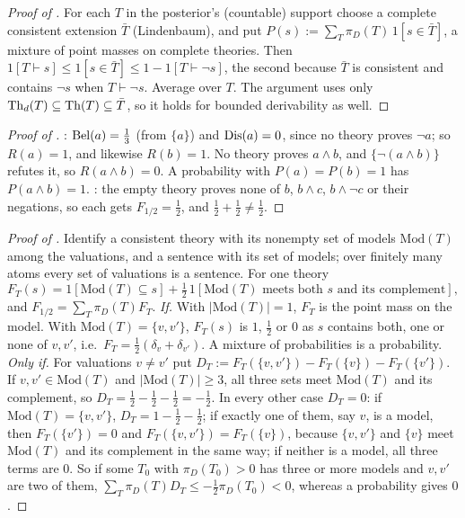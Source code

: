 \begin{proof}[Proof of ]
For each $T$ in the posterior's (countable) support choose a complete consistent extension $\bar T$ (Lindenbaum), and put $P(s):=\sum_T\pi_D(T)\,1[s\in\bar T]$, a mixture of point masses on complete theories. Then $1[T\vdash s]\le1[s\in\bar T]\le1-1[T\vdash\neg s]$, the second because $\bar T$ is consistent and contains $\neg s$ when $T\vdash\neg s$. Average over $T$. The argument uses only $\mathrm{Th}_d(T)\subseteq\mathrm{Th}(T)\subseteq\bar T$, so it holds for bounded derivability as well.
\end{proof}

\begin{proof}[Proof of ]
: $\mathrm{Bel}(a)=\tfrac13$ (from $\{a\}$) and $\mathrm{Dis}(a)=0$, since no theory proves $\neg a$; so $R(a)=1$, and likewise $R(b)=1$. No theory proves $a\wedge b$, and $\{\neg(a\wedge b)\}$ refutes it, so $R(a\wedge b)=0$. A probability with $P(a)=P(b)=1$ has $P(a\wedge b)=1$.
: the empty theory proves none of $b$, $b\wedge c$, $b\wedge\neg c$ or their negations, so each gets $F_{1/2}=\tfrac12$, and $\tfrac12+\tfrac12\ne\tfrac12$.
\end{proof}

\begin{proof}[Proof of ]
Identify a consistent theory with its nonempty set of models $\mathrm{Mod}(T)$ among the valuations, and a sentence with its set of models; over finitely many atoms every set of valuations is a sentence. For one theory
\[
F_T(s)=1[\mathrm{Mod}(T)\subseteq s]+\tfrac12\,1[\mathrm{Mod}(T)\text{ meets both }s\text{ and its complement}],
\]
and $F_{1/2}=\sum_T\pi_D(T)F_T$.
\emph{If.} With $|\mathrm{Mod}(T)|=1$, $F_T$ is the point mass on the model. With $\mathrm{Mod}(T)=\{v,v'\}$, $F_T(s)$ is $1$, $\tfrac12$ or $0$ as $s$ contains both, one or none of $v,v'$, i.e.\ $F_T=\tfrac12(\delta_v+\delta_{v'})$. A mixture of probabilities is a probability.
\emph{Only if.} For valuations $v\ne v'$ put $D_T:=F_T(\{v,v'\})-F_T(\{v\})-F_T(\{v'\})$. If $v,v'\in\mathrm{Mod}(T)$ and $|\mathrm{Mod}(T)|\ge3$, all three sets meet $\mathrm{Mod}(T)$ and its complement, so $D_T=\tfrac12-\tfrac12-\tfrac12=-\tfrac12$. In every other case $D_T=0$: if $\mathrm{Mod}(T)=\{v,v'\}$, $D_T=1-\tfrac12-\tfrac12$; if exactly one of them, say $v$, is a model, then $F_T(\{v'\})=0$ and $F_T(\{v,v'\})=F_T(\{v\})$, because $\{v,v'\}$ and $\{v\}$ meet $\mathrm{Mod}(T)$ and its complement in the same way; if neither is a model, all three terms are $0$. So if some $T_0$ with $\pi_D(T_0)>0$ has three or more models and $v,v'$ are two of them, $\sum_T\pi_D(T)D_T\le-\tfrac12\pi_D(T_0)<0$, whereas a probability gives $0$.
\end{proof}

